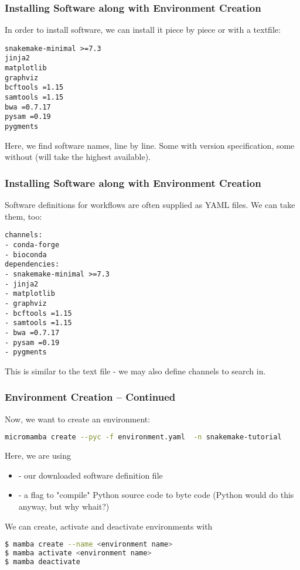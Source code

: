 \begin{frame}[fragile]
	\frametitle{Installing Software along with Environment Creation}
	In order to install software, we can install it piece by piece or with a textfile:
	\begin{lstlisting}[style=Plain]
snakemake-minimal >=7.3
jinja2
matplotlib
graphviz
bcftools =1.15
samtools =1.15
bwa =0.7.17
pysam =0.19
pygments
   \end{lstlisting}
   Here, we find software names, line by line. Some with version specification, some without (will take the highest available).
\end{frame}	

\begin{frame}[fragile]
	\frametitle{Installing Software along with Environment Creation}
	Software definitions for workflows are often supplied as YAML files. We can take them, too:
	\begin{lstlisting}[style=Plain]
channels:
- conda-forge
- bioconda
dependencies:
- snakemake-minimal >=7.3
- jinja2
- matplotlib
- graphviz
- bcftools =1.15
- samtools =1.15
- bwa =0.7.17
- pysam =0.19
- pygments
    \end{lstlisting}
    This is similar to the text file - we may also define channels to search in.
\end{frame}	

\begin{frame}[fragile]
  \frametitle{Environment Creation -- Continued}
  Now, we want to create an environment:
  \begin{lstlisting}[language=Bash, style=Shell]
micromamba create --pyc -f environment.yaml  -n snakemake-tutorial
  \end{lstlisting}
  Here, we are using
  \begin{itemize}
    \item {} - our downloaded software definition file
    \item {} - a flag to "compile" Python source code to byte code (Python would do this anyway, but why whait?)
  \end{itemize}
\end{frame}		

\begin{frame}[fragile]
  We can create, activate and deactivate environments with
  \begin{lstlisting}[language=Bash, style=Shell]
$ mamba create --name <environment name>
$ mamba activate <environment name>
$ mamba deactivate
  \end{lstlisting}
\end{frame}



